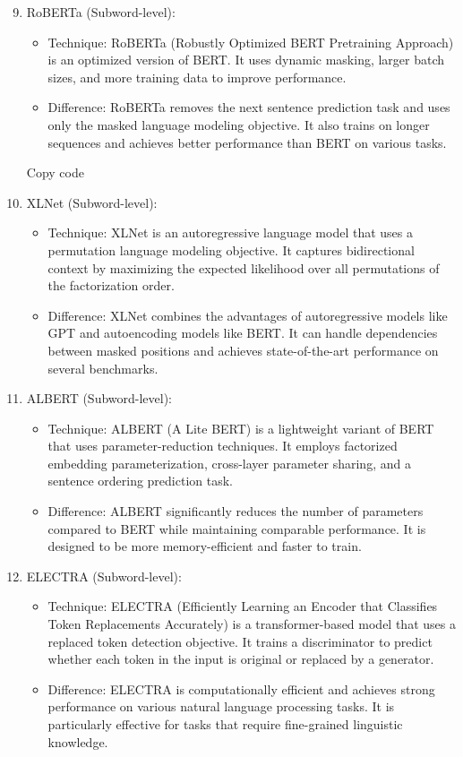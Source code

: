 \begin{enumerate}
\setcounter{enumi}{8}
\item RoBERTa (Subword-level):
\begin{itemize}
\item Technique: RoBERTa (Robustly Optimized BERT Pretraining Approach) is an optimized version of BERT. It uses dynamic masking, larger batch sizes, and more training data to improve performance.
\item Difference: RoBERTa removes the next sentence prediction task and uses only the masked language modeling objective. It also trains on longer sequences and achieves better performance than BERT on various tasks.
\end{itemize}


Copy code
\item XLNet (Subword-level):
\begin{itemize}
    \item Technique: XLNet is an autoregressive language model that uses a permutation language modeling objective. It captures bidirectional context by maximizing the expected likelihood over all permutations of the factorization order.
    \item Difference: XLNet combines the advantages of autoregressive models like GPT and autoencoding models like BERT. It can handle dependencies between masked positions and achieves state-of-the-art performance on several benchmarks.
\end{itemize}

\item ALBERT (Subword-level):
\begin{itemize}
    \item Technique: ALBERT (A Lite BERT) is a lightweight variant of BERT that uses parameter-reduction techniques. It employs factorized embedding parameterization, cross-layer parameter sharing, and a sentence ordering prediction task.
    \item Difference: ALBERT significantly reduces the number of parameters compared to BERT while maintaining comparable performance. It is designed to be more memory-efficient and faster to train.
\end{itemize}

\item ELECTRA (Subword-level):
\begin{itemize}
    \item Technique: ELECTRA (Efficiently Learning an Encoder that Classifies Token Replacements Accurately) is a transformer-based model that uses a replaced token detection objective. It trains a discriminator to predict whether each token in the input is original or replaced by a generator.
    \item Difference: ELECTRA is computationally efficient and achieves strong performance on various natural language processing tasks. It is particularly effective for tasks that require fine-grained linguistic knowledge.
\end{itemize}


\end{enumerate}
